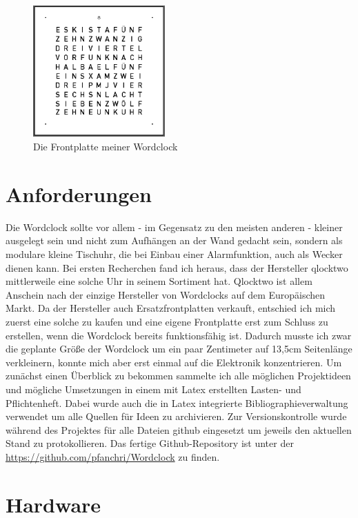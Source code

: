 \documentclass[12pt,journal,compsoc]{IEEEtran}
\begin{document}
\begin{figure}
	\centering
	\includegraphics[width=0.45\textwidth]{Bilder/Frontplatte1}
	\caption{Die Frontplatte meiner Wordclock} 
	\label{fig:Frontplatte1}
\end{figure}

\section{Anforderungen}
Die Wordclock sollte vor allem - im Gegensatz zu den meisten anderen - kleiner ausgelegt sein und nicht zum Aufhängen an der Wand gedacht sein, sondern als modulare kleine Tischuhr, die bei Einbau einer Alarmfunktion, auch als Wecker dienen kann.
Bei ersten Recherchen fand ich heraus, dass der Hersteller qlocktwo mittlerweile eine solche Uhr in seinem Sortiment hat. Qlocktwo ist allem Anschein nach der einzige Hersteller von Wordclocks auf dem Europäischen Markt. Da der Hersteller auch Ersatzfrontplatten verkauft, entschied ich mich zuerst eine solche zu kaufen und eine eigene Frontplatte erst zum Schluss zu erstellen, wenn die Wordclock bereits funktionsfähig ist. Dadurch musste ich zwar die geplante Größe der Wordclock um ein paar Zentimeter auf 13,5cm Seitenlänge verkleinern, konnte mich aber erst einmal auf die Elektronik konzentrieren.
Um zunächst einen Überblick zu bekommen sammelte ich alle möglichen Projektideen und mögliche Umsetzungen in einem mit Latex erstellten Lasten- und Pflichtenheft. Dabei wurde auch die in Latex integrierte Bibliographieverwaltung verwendet um alle Quellen für Ideen zu archivieren. Zur Versionskontrolle wurde während des Projektes für alle Dateien github eingesetzt um jeweils den aktuellen Stand zu protokollieren. Das fertige Github-Repository ist unter der \url{https://github.com/pfanchri/Wordclock} zu finden.


\section{Hardware}
\end{document}
